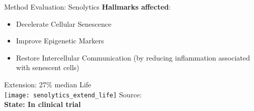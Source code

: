 % 
% 
% 


\begin{frame}[c]{Method Evaluation: Senolytics}
    \textbf{Hallmarks affected}: \\
    \begin{itemize}[<+(1)->]
        \item Decelerate Cellular Senescence
        \item Improve Epigenetic Markers
        \item Restore Intercellular Communication (by reducing inflammation associated with senescent cells)
    \end{itemize}
    \pause
    Extension: 27\% median Life\\
    \texttt{[image: senolytics\_extend\_life]}
    Source: \cite{baker2016naturally} \\
    \pause
    \textbf{State: In clinical trial}
\end{frame}


